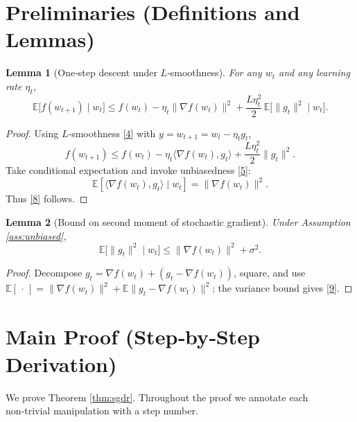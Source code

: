 \documentclass{article}
\newtheorem{lemma}{Lemma}
\begin{document}
\section*{Preliminaries (Definitions and Lemmas)}
\begin{lemma}[One‑step descent under $L$‑smoothness]\label{lem:descent}
For any $w_t$ and any learning rate $\eta_t$,
\[
\mathbb{E}\big[f(w_{t+1})\mid w_t\big]
\le f(w_t)-\eta_t\|\nabla f(w_t)\|^2
+\frac{L\eta_t^2}{2}\,\mathbb{E}\big[\|g_t\|^2\mid w_t\big].
\tag{8}
\]
\end{lemma}
\begin{proof}
Using $L$‑smoothness \eqref{4} with $y=w_{t+1}=w_t-\eta_t g_t$,
\[
f(w_{t+1})\le f(w_t)-\eta_t\langle\nabla f(w_t),g_t\rangle
+\frac{L\eta_t^2}{2}\|g_t\|^2 .
\]
Take conditional expectation and invoke unbiasedness \eqref{5}:
\[
\mathbb{E}[\langle\nabla f(w_t),g_t\rangle\mid w_t]
= \|\nabla f(w_t)\|^2 .
\]
Thus \eqref{8} follows. \hfill\qedsymbol
\end{proof}

\begin{lemma}[Bound on second moment of stochastic gradient]\label{lem:second}
Under Assumption \ref{ass:unbiased},
\[
\mathbb{E}\big[\|g_t\|^2\mid w_t\big]\le
\|\nabla f(w_t)\|^2+\sigma^2 .
\tag{9}
\]
\end{lemma}
\begin{proof}
Decompose $g_t=\nabla f(w_t)+(g_t-\nabla f(w_t))$, square, and use $\mathbb{E}[\,\cdot\,]=\|\nabla f(w_t)\|^2+\mathbb{E}\|g_t-\nabla f(w_t)\|^2$; the variance bound gives \eqref{9}. \hfill\qedsymbol
\end{proof}

\section*{Main Proof (Step‑by‑Step Derivation)}
We prove Theorem \ref{thm:sgdr}. Throughout the proof we annotate each non‑trivial manipulation with a step number.
\end{document}
